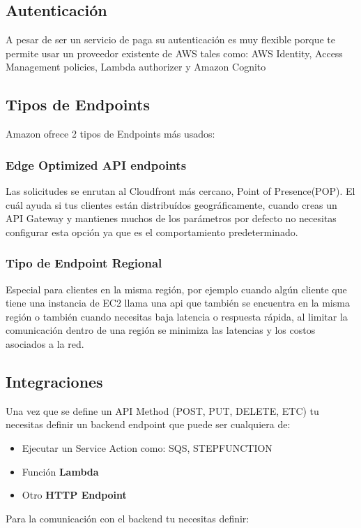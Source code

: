 \subsection{Autenticación}
A pesar de ser un servicio de paga su autenticación es muy flexible porque te permite usar un proveedor existente de AWS tales como: AWS Identity, Access Management policies, Lambda authorizer y Amazon Cognito

\subsection{Tipos de Endpoints}
Amazon ofrece 2 tipos de Endpoints más usados:
\subsubsection{Edge Optimized API endpoints}
Las solicitudes se enrutan al Cloudfront más cercano, Point of Presence(POP). El cuál ayuda si tus clientes están distribuídos geográficamente, cuando creas un API Gateway y mantienes muchos de los parámetros por defecto no necesitas configurar esta opción ya que es el comportamiento predeterminado.

\subsubsection{Tipo de Endpoint Regional}
Especial para clientes en la misma región, por ejemplo cuando algún cliente que tiene una instancia de EC2 llama una api que también se encuentra en la misma región o también cuando necesitas baja latencia o respuesta rápida, al limitar la comunicación dentro de una región se minimiza las latencias y los costos asociados a la red.

\subsection{Integraciones}
Una vez que se define un API Method (POST, PUT, DELETE, ETC) tu necesitas definir un backend endpoint que puede ser cualquiera de:\
\begin{itemize}
	\item Ejecutar un Service Action como: SQS, STEPFUNCTION
	\item Función \textbf{Lambda}
	\item Otro \textbf{HTTP Endpoint}
\end{itemize}

Para la comunicación con el backend tu necesitas definir: \

